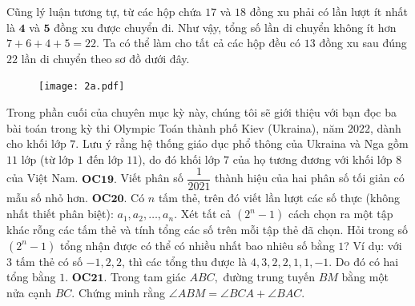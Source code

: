 \begin{multicols}{2}
	\vskip 0.1cm
	Cũng lý luận tương tự, từ các hộp chứa $17$ và $18$ đồng xu phải có lần lượt ít nhất là $\pmb{4}$ và $\pmb{5}$ đồng xu được chuyển đi. Như vậy, tổng số lần di chuyển không ít hơn $7+ 6 + 4 + 5 =22$.
	\vskip 0.1cm
	Ta có thể làm cho tất cả các hộp đều có $13$ đồng xu sau đúng $22$ lần di chuyển theo sơ đồ dưới đây. 
	\begin{figure}[H]
		\vspace*{-5pt}
		\centering
		\captionsetup{labelformat= empty, justification=centering}
		\texttt{[image: 2a.pdf]}
		\vspace*{-10pt}
	\end{figure}
	Trong phần cuối của chuyên mục kỳ này, chúng tôi sẽ giới thiệu với bạn đọc ba bài toán trong kỳ thi Olympic Toán thành phố Kiev (Ukraina), năm $2022$, dành cho khối lớp $7$. Lưu ý rằng hệ thống giáo dục phổ thông của Ukraina và Nga gồm $11$ lớp (từ lớp $1$ đến lớp $11$), do đó khối lớp $7$ của họ tương đương với khối lớp $8$ của Việt Nam.
	\vskip 0.1cm
	{\bf\color{cackithi} OC$\pmb{19.}$}  Viết phân số $\dfrac{1}{2021}$ thành hiệu của hai phân số tối giản có mẫu số nhỏ hơn.
	\vskip 0.1cm
	{\bf\color{cackithi} OC$\pmb{20.}$} Có $n$ tấm thẻ, trên đó viết lần lượt các số thực (không nhất thiết phân biệt): $a_1, a_2, \ldots, a_n$.  Xét tất cả $ (2^n-1) $ cách chọn ra một tập khác rỗng các tấm thẻ và tính tổng các số trên mỗi tập thẻ đã chọn. Hỏi trong số $(2^n-1)$ tổng nhận được có thể có nhiều nhất bao nhiêu số bằng $1$?
	\vskip 0.1cm
	Ví dụ: với $3$ tấm thẻ có số $-1, 2, 2$, thì các tổng thu được là $4, 3, 2, 2, 1, 1, -1.$ Do đó có hai tổng bằng $1$.
	\vskip 0.1cm
	{\bf\color{cackithi} OC$\pmb{21.}$} Trong tam giác $ ABC,$ đường trung tuyến $BM $ bằng một nửa cạnh $ BC $. Chứng minh rằng $ \angle ABM = \angle BCA + \angle BAC .$
\end{multicols}